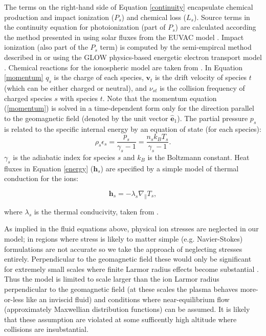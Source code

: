 \documentclass[11pt,letterpaper]{article}
\begin{document}
The terms on the right-hand side of Equation \ref{continuity} encapsulate chemical production and impact ionization ($P_s$) and chemical loss ($L_s$). Source terms in the continuity equation for photoionization (part of $P_s$) are calculated according the method presented in \citet{Solomon:2005} using solar fluxes from the EUVAC model \citep{Richards:1994}. Impact ionization (also part of the $P_s$ term) is computed by the semi-empircal method described in \citet{Fang:2008} or using the GLOW physics-based energetic electron transport model \citep{Solomon:2001}. Chemical reactions for the ionospheric model are taken from \citet[][and references therein]{Diloy:1996,StMaurice:1998}. In Equation \ref{momentum} $q_s$ is the charge of each species, $\mathbf{v}_t$ is the drift velocity of species $t$ (which can be either charged or neutral), and $\nu_{st}$ is the collision frequency of charged species $s$ with species $t$. Note that the momentum equation (\ref{momentum}) is solved in a time-dependent form only for the direction parallel to the geomagnetic field (denoted by the unit vector $\hat{\mathbf{e}}_1$). The partial pressure $p_s$ is related to the specific internal energy by an equation of state (for each species):
\begin{equation}
\rho_s \epsilon_s = \frac{p_s}{\gamma_s - 1} = \frac{n_s k_B T_s}{\gamma_s - 1}.
\end{equation}
$\gamma_s$ is the adiabatic index for species $s$ and $k_B$ is the Boltzmann constant.  Heat fluxes in Equation \ref{energy} ($\mathbf{h}_s$) are specified by a simple model of thermal conduction for the ions:  
\begin{linenomath*} \begin{equation}
\mathbf{h}_s = - \lambda_s \nabla_{\parallel} T_s,
\end{equation} \end{linenomath*}
where $\lambda_s$ is the thermal conducivity, taken from \citet{Schunk:1975}.  

As implied in the fluid equations above, physical ion stresses are neglected in our model; in regions where stress is likely to matter simple (e.g. Navier-Stokes) formulations are not accurate \citep{Schunk:1974} so we take the approach of neglecting stresses entirely.  Perpendicular to the geomagnetic field these would only be significant for extremely small scales where finite Larmor radius effects become substantial \citep{Huba:1996}.  Thus the model is limited to scale larger than the ion Larmor radius perpendicular to the geomagnetic field (at these scales the plasma behaves more-or-less like an inviscid fluid) and conditions where near-equilibrium flow (approximately Maxwellian distribution functions) can be assumed.  It is likely that these assumption are violated at some sufficently high altitude where collisions are insubstantial.  
\end{document}
